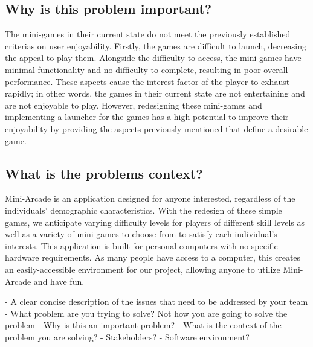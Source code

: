 \documentclass{article}
\begin{document}
\subsection{Why is this problem important?}
The mini-games in their current state do not meet the previously established criterias on user enjoyability. Firstly, the games are difficult to launch, decreasing the appeal to play them. Alongside the difficulty to access, the mini-games have minimal functionality and no difficulty to complete, resulting in poor overall performance. These aspects cause the interest factor of the player to exhaust rapidly; in other words, the games in their current state are not entertaining and are not enjoyable to play. However, redesigning these mini-games and implementing a launcher for the games has a high potential to improve their enjoyability by providing the aspects previously mentioned that define a desirable game.

\subsection{What is the problems context?}
Mini-Arcade is an application designed for anyone interested, regardless of the individuals' demographic characteristics. With the redesign of these simple games, we anticipate varying difficulty levels for players of different skill levels as well as a variety of mini-games to choose from to satisfy each individual's interests. This application is built for personal computers with no specific hardware requirements. As many people have access to a computer, this creates an easily-accessible environment for our project, allowing anyone to utilize Mini-Arcade and have fun.

- A clear concise description of the issues that need to be addressed by your team
- What problem are you trying to solve? Not how you are going to solve the problem
- Why is this an important problem?
- What is the context of the problem you are solving?
	- Stakeholders?
	- Software environment?
	





\end{document}
